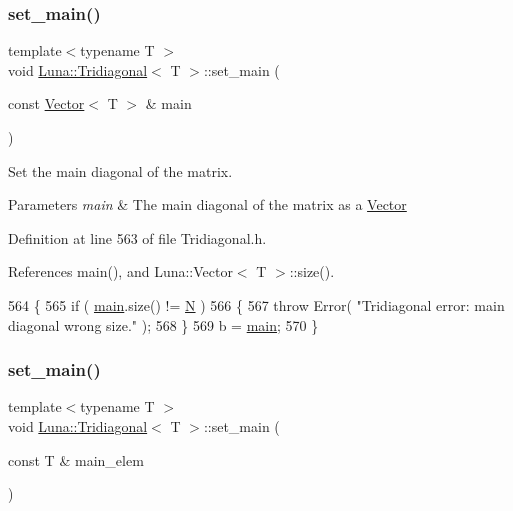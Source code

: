 \subsubsection{\texorpdfstring{set\+\_\+main()}{set\_main()}\hspace{0.1cm}{\footnotesize\ttfamily [1/2]}}
{\footnotesize\ttfamily template$<$typename T $>$ \\
void \hyperlink{classLuna_1_1Tridiagonal}{Luna\+::\+Tridiagonal}$<$ T $>$\+::set\+\_\+main (\begin{DoxyParamCaption}\item[{const \hyperlink{classLuna_1_1Vector}{Vector}$<$ T $>$ \&}]{main }\end{DoxyParamCaption})\hspace{0.3cm}{\ttfamily [inline]}}



Set the main diagonal of the matrix. 


\begin{DoxyParams}{Parameters}
{\em main} & The main diagonal of the matrix as a \hyperlink{classLuna_1_1Vector}{Vector} \\
\hline
\end{DoxyParams}


Definition at line 563 of file Tridiagonal.\+h.



References main(), and Luna\+::\+Vector$<$ T $>$\+::size().


\begin{DoxyCode}
564   \{
565     \textcolor{keywordflow}{if} ( \hyperlink{Banded__test_8cpp_ae66f6b31b5ad750f1fe042a706a4e3d4}{main}.size() != \hyperlink{namespaceHeat__plot_a7d050092798e28458a263710837bda77}{N} )
566     \{
567       \textcolor{keywordflow}{throw} Error( \textcolor{stringliteral}{"Tridiagonal error: main diagonal wrong size."} );
568     \}
569     b = \hyperlink{Banded__test_8cpp_ae66f6b31b5ad750f1fe042a706a4e3d4}{main};
570   \}
\end{DoxyCode}
\mbox{\label{classLuna_1_1Tridiagonal_a2c333c2bd6de2d9432a2325979240c93}} 
\subsubsection{\texorpdfstring{set\+\_\+main()}{set\_main()}\hspace{0.1cm}{\footnotesize\ttfamily [2/2]}}
{\footnotesize\ttfamily template$<$typename T $>$ \\
void \hyperlink{classLuna_1_1Tridiagonal}{Luna\+::\+Tridiagonal}$<$ T $>$\+::set\+\_\+main (\begin{DoxyParamCaption}\item[{const T \&}]{main\+\_\+elem }\end{DoxyParamCaption})\hspace{0.3cm}{\ttfamily [inline]}}



